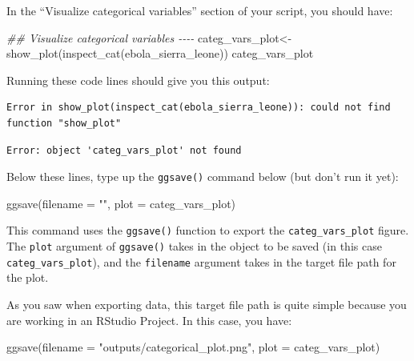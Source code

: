 \documentclass[
  letterpaper,
  DIV=11,
  numbers=noendperiod]{scrreprt}
\newenvironment{Shaded}{\begin{snugshade}}{\end{snugshade}}
\newcommand{\AttributeTok}[1]{\textcolor[rgb]{0.40,0.45,0.13}{#1}}
\newcommand{\DocumentationTok}[1]{\textcolor[rgb]{0.37,0.37,0.37}{\textit{#1}}}
\newcommand{\FunctionTok}[1]{\textcolor[rgb]{0.28,0.35,0.67}{#1}}
\newcommand{\NormalTok}[1]{\textcolor[rgb]{0.00,0.23,0.31}{#1}}
\newcommand{\OtherTok}[1]{\textcolor[rgb]{0.00,0.23,0.31}{#1}}
\newcommand{\StringTok}[1]{\textcolor[rgb]{0.13,0.47,0.30}{#1}}
\begin{document}
In the ``Visualize categorical variables'' section of your script, you
should have:

\begin{Shaded}
\begin{Highlighting}[]
\DocumentationTok{\#\# Visualize categorical variables {-}{-}{-}{-}}
\NormalTok{categ\_vars\_plot}\OtherTok{\textless{}{-}} \FunctionTok{show\_plot}\NormalTok{(}\FunctionTok{inspect\_cat}\NormalTok{(ebola\_sierra\_leone))}
\NormalTok{categ\_vars\_plot}
\end{Highlighting}
\end{Shaded}

Running these code lines should give you this output:

\begin{verbatim}
Error in show_plot(inspect_cat(ebola_sierra_leone)): could not find function "show_plot"
\end{verbatim}

\begin{verbatim}
Error: object 'categ_vars_plot' not found
\end{verbatim}

Below these lines, type up the \texttt{ggsave()} command below (but
don't run it yet):

\begin{Shaded}
\begin{Highlighting}[]
\FunctionTok{ggsave}\NormalTok{(}\AttributeTok{filename =} \StringTok{""}\NormalTok{, }\AttributeTok{plot =}\NormalTok{ categ\_vars\_plot)}
\end{Highlighting}
\end{Shaded}

This command uses the \texttt{ggsave()} function to export the
\texttt{categ\_vars\_plot} figure. The \texttt{plot} argument of
\texttt{ggsave()} takes in the object to be saved (in this case
\texttt{categ\_vars\_plot}), and the \texttt{filename} argument takes in
the target file path for the plot.

As you saw when exporting data, this target file path is quite simple
because you are working in an RStudio Project. In this case, you have:

\begin{Shaded}
\begin{Highlighting}[]
\FunctionTok{ggsave}\NormalTok{(}\AttributeTok{filename =} \StringTok{"outputs/categorical\_plot.png"}\NormalTok{, }\AttributeTok{plot =}\NormalTok{ categ\_vars\_plot)}
\end{Highlighting}
\end{Shaded}
\end{document}
